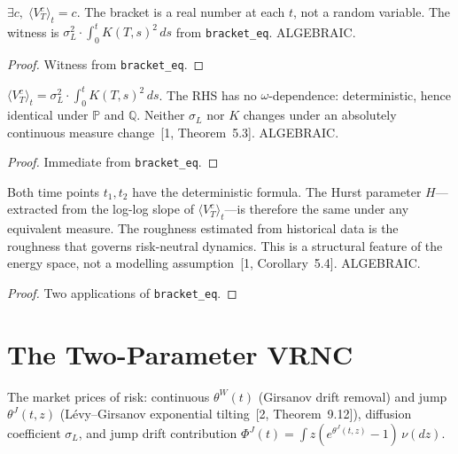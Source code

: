 \begin{theorem}\label{thm:bracket_deterministic}
\leanok
{}
$\exists c,\;\langle V_T^c \rangle_t = c$. The bracket is a real number at each $t$, not a random variable. The witness is $\sigma_L^2 \cdot \int_0^t K(T,s)^2\,ds$ from \texttt{bracket\_eq}. ALGEBRAIC.
\end{theorem}
\begin{proof}\leanok Witness from \texttt{bracket\_eq}.\end{proof}

\begin{theorem}\label{thm:bracket_measure_invariant}
\leanok
{}
$\langle V_T^c \rangle_t = \sigma_L^2 \cdot \int_0^t K(T,s)^2\,ds$. The RHS has no $\omega$-dependence: deterministic, hence identical under $\mathbb{P}$ and $\mathbb{Q}$. Neither $\sigma_L$ nor $K$ changes under an absolutely continuous measure change~[1, Theorem~5.3]. ALGEBRAIC.
\end{theorem}
\begin{proof}\leanok Immediate from \texttt{bracket\_eq}.\end{proof}

\begin{theorem}\label{thm:roughness_invariant}
\leanok
{}
Both time points $t_1, t_2$ have the deterministic formula. The Hurst parameter $H$---extracted from the log-log slope of $\langle V_T^c \rangle_t$---is therefore the same under any equivalent measure. The roughness estimated from historical data is the roughness that governs risk-neutral dynamics. This is a structural feature of the energy space, not a modelling assumption~[1, Corollary~5.4]. ALGEBRAIC.
\end{theorem}
\begin{proof}\leanok Two applications of \texttt{bracket\_eq}.\end{proof}

\section{The Two-Parameter VRNC}

\begin{defn}\label{def:GirsanovData}
\leanok
The market prices of risk: continuous $\theta^W(t)$ (Girsanov drift removal) and jump $\theta^J(t,z)$ (L\'evy--Girsanov exponential tilting~[2, Theorem~9.12]), diffusion coefficient $\sigma_L$, and jump drift contribution $\Phi^J(t) = \int z(e^{\theta^J(t,z)} - 1)\,\nu(dz)$.
\end{defn}

